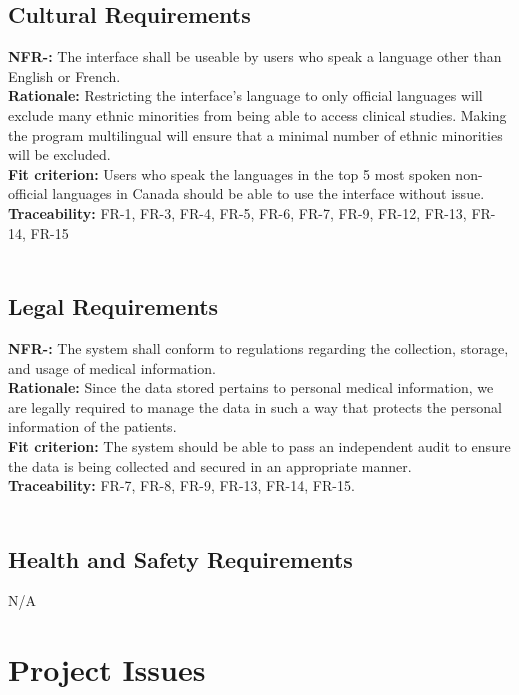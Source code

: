 \documentclass[12pt, titlepage]{article}
\newcounter{NFR_Counter}
\newcounter{FR_Counter}
\begin{document}
\subsection{Cultural Requirements}
\noindent\textbf{NFR-\the\value{NFR_Counter}:}
The interface shall be useable by users who speak a language other than English or French.  \\
\textbf{Rationale:}
Restricting the interface's language to only official languages will exclude many ethnic minorities from being able to access clinical studies. Making the program multilingual will ensure that a minimal number of ethnic minorities will be excluded. \\
\textbf{Fit criterion:}
Users who speak the languages in the top 5 most spoken non-official languages in Canada should be able to use the interface without issue. \\
\textbf{Traceability:}
FR-1, FR-3, FR-4, FR-5, FR-6, FR-7, FR-9, FR-12, FR-13, FR-14, FR-15 \\~\\
\addtocounter{NFR_Counter}{1}

\subsection{Legal Requirements}
\noindent\textbf{NFR-\the\value{NFR_Counter}:}
The system shall conform to regulations regarding the collection, storage, and usage of medical information.  \\
\textbf{Rationale:}
Since the data stored pertains to personal medical information, we are legally required to manage the data in such a way that protects the personal information of the patients. \\
\textbf{Fit criterion:}
The system should be able to pass an independent audit to ensure the data is being collected and secured in an appropriate manner. \\
\textbf{Traceability:}
FR-7, FR-8, FR-9, FR-13, FR-14, FR-15. \\~\\
\addtocounter{NFR_Counter}{1}

\subsection{Health and Safety Requirements}

N/A

\section{Project Issues}
\end{document}
